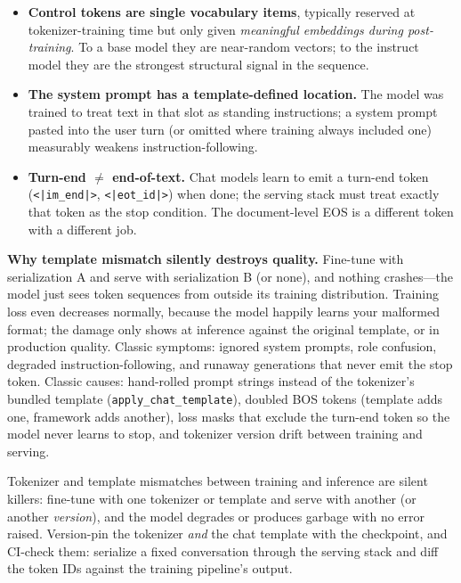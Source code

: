 \begin{itemize}
    \item \textbf{Control tokens are single vocabulary items}, typically reserved at tokenizer-training time but only given \emph{meaningful embeddings during post-training}. To a base model they are near-random vectors; to the instruct model they are the strongest structural signal in the sequence.
    \item \textbf{The system prompt has a template-defined location.} The model was trained to treat text in that slot as standing instructions; a system prompt pasted into the user turn (or omitted where training always included one) measurably weakens instruction-following.
    \item \textbf{Turn-end $\neq$ end-of-text.} Chat models learn to emit a turn-end token (\verb+<|im_end|>+, \verb+<|eot_id|>+) when done; the serving stack must treat exactly that token as the stop condition. The document-level EOS is a different token with a different job.
\end{itemize}

\textbf{Why template mismatch silently destroys quality.} Fine-tune with serialization A and serve with serialization B (or none), and nothing crashes---the model just sees token sequences from outside its training distribution. Training loss even decreases normally, because the model happily learns your malformed format; the damage only shows at inference against the original template, or in production quality. Classic symptoms: ignored system prompts, role confusion, degraded instruction-following, and runaway generations that never emit the stop token. Classic causes: hand-rolled prompt strings instead of the tokenizer's bundled template (\texttt{apply\_chat\_template}), doubled BOS tokens (template adds one, framework adds another), loss masks that exclude the turn-end token so the model never learns to stop, and tokenizer version drift between training and serving.

\begin{warningbox}
Tokenizer and template mismatches between training and inference are silent killers: fine-tune with one tokenizer or template and serve with another (or another \emph{version}), and the model degrades or produces garbage with no error raised. Version-pin the tokenizer \emph{and} the chat template with the checkpoint, and CI-check them: serialize a fixed conversation through the serving stack and diff the token IDs against the training pipeline's output.
\end{warningbox}

